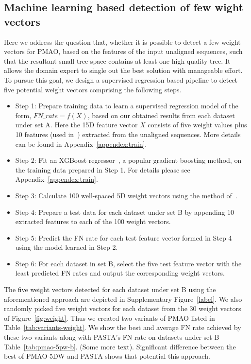 \subsection{Machine learning based detection of few wight vectors}
Here we address the question that, whether it is possible to detect a few weight vectors for PMAO, based on the features of the input unaligned sequences, such that the resultant small tree-space contains at least one high quality tree. It allows the domain expert to single out the best solution with manageable effort. To pursue this goal, we design a supervised regression based pipeline to detect five potential weight vectors comprising the following steps.
\begin{itemize}
	\item Step 1: Prepare training data to learn a supervised regression model of the form, $FN\_rate = f(X)$, based on our obtained results from each dataset under set A. Here the 15D feature vector $X$ consists of five weight values plus 10 features (used in~\cite{rubio2018characteristic}) extracted from the unaligned sequences. More details can be found in Appendix~\ref{appendex:train}. 
	\item Step 2: Fit an XGBoost regressor~\cite{bibid}, a popular gradient boosting method, on the training data prepared in Step 1. For details please see Appendix~\ref{appendex:train}. 
	\item Step 3: Calculate 100 well-spaced 5D weight vectors using the method of~\cite{ref_dirs_energy}.
	\item Step 4: Prepare a test data for each dataset under set B by appending 10 extracted features to each of the 100 weight vectors.
	\item Step 5: Predict the FN rate for each test feature vector formed in Step 4 using the model learned in Step 2. 
	\item Step 6: For each dataset in set B, select the five test feature vector with the least predicted FN rates and output the corresponding weight vectors.
\end{itemize}

The five weight vectors detected for each dataset under set B using the aforementioned approach are depicted in Supplementary Figure~\ref{label}. We also randomly picked five weight vectors for each dataset from the 30 weight vectors of Figure~\ref{fig:weight}. Thus we created two variants of PMAO listed in Table~\ref{tab:variants-weight}. We show the best and average FN rate achieved by these two variants along with PASTA's FN rate on datasets under set B Table~\ref{tab:pmao-5pw-b}. (Some more text). Significant difference between the best of PMAO-5DW and PASTA shows that potential this approach. 

